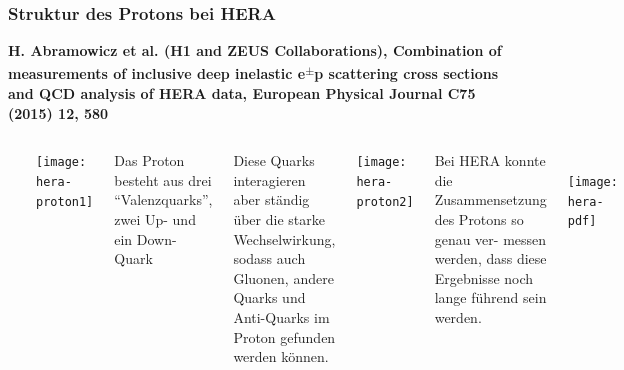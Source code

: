 \documentclass[10pt,t]{beamer}
\begin{document}
\begin{frame}
\frametitle{Struktur des Protons bei HERA}
\vspace*{-2.6\baselineskip}
\alert{\bfseries\footnotesize H. Abramowicz et al. (H1 and ZEUS Collaborations), Combination of measurements of inclusive deep inelastic e\textsuperscript{$\pm$}p scattering cross sections and QCD analysis of HERA data, European Physical Journal C75 (2015) 12, 580 \cite{Abramowicz2015}}
\vspace*{\baselineskip}
\begin{columns}
~\\[-\baselineskip]
\begin{minipage}[c]{0.3\textwidth}
    \texttt{[image: hera-proton1]}
\end{minipage}
\hfill
\begin{minipage}[c]{0.65\textwidth}\raggedright
    Das Proton besteht aus drei ``Valenzquarks'', zwei Up- und ein Down-Quark
\end{minipage}\vspace*{1ex}

Diese Quarks interagieren aber ständig über die starke Wechselwirkung, sodass auch Gluonen, andere Quarks und Anti-Quarks im Proton gefunden werden können.  

\begin{minipage}[c]{0.35\textwidth}
    \texttt{[image: hera-proton2]}
\end{minipage}
\hfill
\begin{minipage}[c]{0.6\textwidth}\raggedright
Bei HERA konnte die Zusammensetzung des Protons so genau ver- messen werden, dass diese Ergebnisse noch lange führend sein werden.
\end{minipage}
~\\[-\baselineskip]
    \texttt{[image: hera-pdf]}
\end{columns}
\vspace*{-7pt}
\end{frame}
\end{document}
